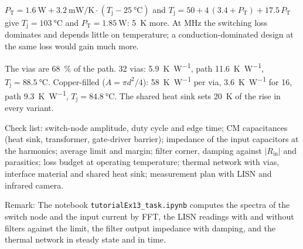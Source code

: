 \begin{solutionblock}
	$P_\mathrm{T}=\SI{1.6}{\watt}+\SI{3.2}{\milli\watt\per\kelvin}\cdot(T_\mathrm{j}-\SI{25}{\celsius})$ and $T_\mathrm{j}=50+4\,(3.4+P_\mathrm{T})+17.5\,P_\mathrm{T}$ give $T_\mathrm{j}=\SI{103}{\celsius}$ and $P_\mathrm{T}=\SI{1.85}{\watt}$: \SI{5}{\kelvin} more. At MHz the switching loss dominates and depends little on temperature; a conduction-dominated design at the same loss would gain much more.
\end{solutionblock}


\begin{solutionblock}
	The vias are \SI{68}{\percent} of the path. 32 vias: \SI{5.9}{\kelvin\per\watt}, path \SI{11.6}{\kelvin\per\watt}, $T_\mathrm{j}=\SI{88.5}{\celsius}$. Copper-filled ($A=\pi d^2/4$): \SI{58}{\kelvin\per\watt} per via, \SI{3.6}{\kelvin\per\watt} for 16, path \SI{9.3}{\kelvin\per\watt}, $T_\mathrm{j}=\SI{84.8}{\celsius}$. The shared heat sink sets \SI{20}{\kelvin} of the rise in every variant.
\end{solutionblock}




\begin{solutionblock}
	Check list: switch-node amplitude, duty cycle and edge time; CM capacitances (heat sink, transformer, gate-driver barrier); impedance of the input capacitors at the harmonics; average limit and margin; filter corner, damping against $|R_\mathrm{in}|$ and parasitics; loss budget at operating temperature; thermal network with vias, interface material and shared heat sink; measurement plan with LISN and infrared camera.
\end{solutionblock}

\vspace{0.5cm}
Remark: The notebook \texttt{tutorialEx13\_task.ipynb} computes the spectra of the switch node and the input current by FFT, the LISN readings with and without filters against the limit, the filter output impedance with damping, and the thermal network in steady state and in time.
